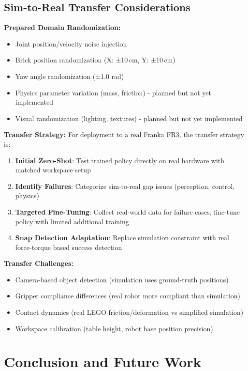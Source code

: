\documentclass[12pt,a4paper,oneside]{report}
\begin{document}
\section{Sim-to-Real Transfer Considerations}
\label{sec:sim_to_real}

\textbf{Prepared Domain Randomization:}
\begin{itemize}
    \item Joint position/velocity noise injection
    \item Brick position randomization (X: ±10\,cm, Y: ±10\,cm)
    \item Yaw angle randomization (±1.0 rad)
    \item Physics parameter variation (mass, friction) - planned but not yet implemented
    \item Visual randomization (lighting, textures) - planned but not yet implemented
\end{itemize}

\textbf{Transfer Strategy:}
For deployment to a real Franka FR3, the transfer strategy is:
\begin{enumerate}
    \item \textbf{Initial Zero-Shot}: Test trained policy directly on real hardware with matched workspace setup
    \item \textbf{Identify Failures}: Categorize sim-to-real gap issues (perception, control, physics)
    \item \textbf{Targeted Fine-Tuning}: Collect real-world data for failure cases, fine-tune policy with limited additional training
    \item \textbf{Snap Detection Adaptation}: Replace simulation constraint with real force-torque based success detection
\end{enumerate}

\textbf{Transfer Challenges:}
\begin{itemize}
    \item Camera-based object detection (simulation uses ground-truth positions)
    \item Gripper compliance differences (real robot more compliant than simulation)
    \item Contact dynamics (real LEGO friction/deformation vs simplified simulation)
    \item Workspace calibration (table height, robot base position precision)
\end{itemize}

\chapter{Conclusion and Future Work}
\end{document}
